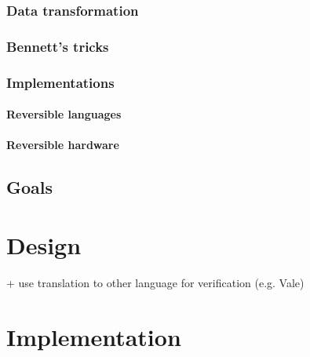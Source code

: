 \documentclass[a4paper,10pt,openright]{memoir}
\begin{document}
\subsection{Data transformation}

\subsection{Bennett's tricks}

\subsection{Implementations}

\subsubsection{Reversible languages}

\subsubsection{Reversible hardware}

\section{Goals}





\chapter{Design}


+ use translation to other language for verification (e.g. Vale)

\chapter{Implementation}

\end{document}
